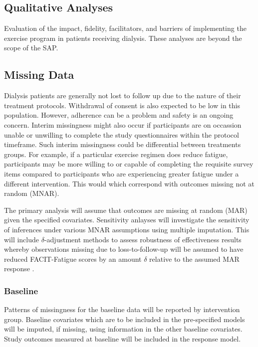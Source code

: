 \documentclass[11pt,parskip=half-]{scrartcl}
\begin{document}
\subsection{Qualitative Analyses}\label{qualitative-analyses}

Evaluation of the impact, fidelity, facilitators, and barriers of implementing the exercise program in patients receiving dialysis. These analyses are beyond the scope of the SAP.

\subsection{Missing Data}\label{missing-data}

Dialysis patients are generally not lost to follow up due to the nature of their treatment protocols. Withdrawal of consent is also expected to be low in this population. However, adherence can be a problem and safety is an ongoing concern. Interim missingness might also occur if participants are on occassion unable or unwilling to complete the study questionnaires within the protocol timeframe. Such interim missingness could be differential between treatments groups. For example, if a particular exercise regimen does reduce fatigue, participants may be more willing to or capable of completing the requisite survey items compared to participants who are experiencing greater fatigue under a different intervention. This would which correspond with outcomes missing not at random (MNAR).

The primary analysis will assume that outcomes are missing at random (MAR) given the specified covariates. Sensitivity anlayses will investigate the sensitivity of inferences under various MNAR assumptions using multiple imputation. This will include $\delta$-adjustment methods to assess robustness of effectiveness results whereby observations missing due to loss-to-follow-up will be assumed to have reduced FACIT-Fatigue scores by an amount $\delta$ relative to the assumed MAR response \cite{carpenter2012multiple}.

\subsubsection{Baseline}

Patterns of missingness for the baseline data will be reported by intervention group. Baseline covariates which are to be included in the pre-specified models will be imputed, if missing, using information in the other baseline covariates. Study outcomes measured at baseline will be included in the response model.
\end{document}
